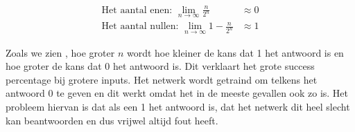 \begin{align*}
     \text{Het aantal enen: } \lim_{n\to\infty} \frac{n}{2^n} & \approx 0  \\
     \text{Het aantal nullen: } \lim_{n\to\infty} 1 - \frac{n}{2^n} & \approx 1
\end{align*}

Zoals we zien , hoe groter $n$ wordt hoe kleiner de kans dat 1 het antwoord is en hoe groter de kans dat 0 het antwoord is. Dit verklaart het grote success percentage bij grotere inputs. Het netwerk wordt getraind om telkens het antwoord 0 te geven en dit werkt omdat het in de meeste gevallen ook zo is. Het probleem hiervan is dat als een 1 het antwoord is, dat het netwerk dit heel slecht kan beantwoorden en dus vrijwel altijd fout heeft.